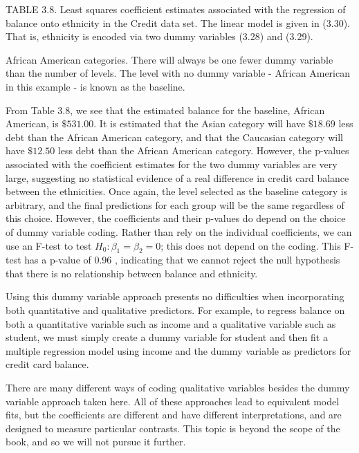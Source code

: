 \documentclass[10pt]{article}
\begin{document}
TABLE 3.8. Least squares coefficient estimates associated with the regression of balance onto ethnicity in the Credit data set. The linear model is given in (3.30). That is, ethnicity is encoded via two dummy variables (3.28) and (3.29).

African American categories. There will always be one fewer dummy variable than the number of levels. The level with no dummy variable - African American in this example - is known as the baseline.

From Table 3.8, we see that the estimated balance for the baseline, African American, is $\$ 531.00$. It is estimated that the Asian category will have $\$ 18.69$ less debt than the African American category, and that the Caucasian category will have $\$ 12.50$ less debt than the African American category. However, the p-values associated with the coefficient estimates for the two dummy variables are very large, suggesting no statistical evidence of a real difference in credit card balance between the ethnicities. Once again, the level selected as the baseline category is arbitrary, and the final predictions for each group will be the same regardless of this choice. However, the coefficients and their p-values do depend on the choice of dummy variable coding. Rather than rely on the individual coefficients, we can use an F-test to test $H_{0}: \beta_{1}=\beta_{2}=0$; this does not depend on the coding. This F-test has a p-value of 0.96 , indicating that we cannot reject the null hypothesis that there is no relationship between balance and ethnicity.

Using this dummy variable approach presents no difficulties when incorporating both quantitative and qualitative predictors. For example, to regress balance on both a quantitative variable such as income and a qualitative variable such as student, we must simply create a dummy variable for student and then fit a multiple regression model using income and the dummy variable as predictors for credit card balance.

There are many different ways of coding qualitative variables besides the dummy variable approach taken here. All of these approaches lead to equivalent model fits, but the coefficients are different and have different interpretations, and are designed to measure particular contrasts. This topic is beyond the scope of the book, and so we will not pursue it further.
\end{document}
